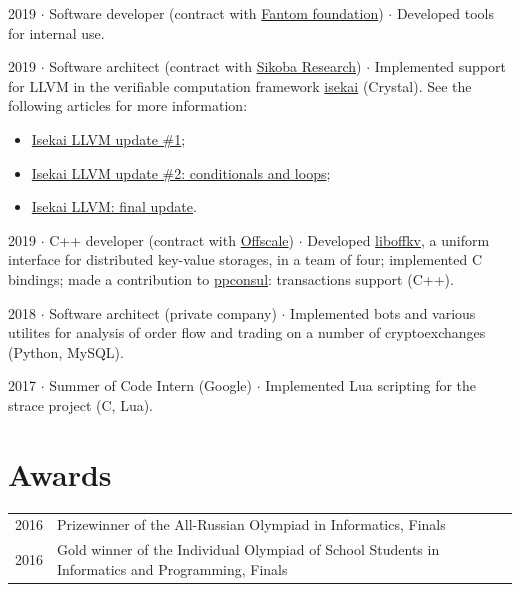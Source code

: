 \documentclass[10pt]{article}
\begin{document}
\medskip

2019 $\cdot$ Software developer (contract with \href{https://fantom.foundation}{Fantom foundation}) $\cdot$ Developed tools for internal use.

\medskip

2019 $\cdot$ Software architect (contract with \href{https://research.sikoba.com}{Sikoba Research}) $\cdot$ Implemented support for LLVM in the verifiable computation framework \href{https://github.com/sikoba/isekai}{isekai} (Crystal). See the following articles for more information:
\begin{itemize}
    \item \href{https://medium.com/sikoba-network/isekai-technical-update-llvm-d5003fc8f009}{Isekai LLVM update \#1};
    \item \href{https://medium.com/sikoba-network/isekai-llvm-update-2-conditionals-and-loops-81296a0eccbf}{Isekai LLVM update \#2: conditionals and loops};
    \item \href{https://medium.com/sikoba-network/isekai-llvm-final-update-894fb6863fcf}{Isekai LLVM: final update}.
\end{itemize}

\medskip

2019 $\cdot$ C++ developer (contract with \href{https://offscale.io}{Offscale}) $\cdot$ Developed \href{https://github.com/offscale/liboffkv}{liboffkv}, a uniform interface for distributed key-value storages, in a team of four; implemented C bindings; made a contribution to \href{https://github.com/oliora/ppconsul}{ppconsul}: transactions support (C++).

\medskip

2018 $\cdot$ Software architect (private company) $\cdot$ Implemented bots and various utilites for analysis of order flow and trading on a number of cryptoexchanges (Python, MySQL).

\medskip

2017 $\cdot$ Summer of Code Intern (Google) $\cdot$ Implemented Lua scripting for the strace project (C, Lua).

\medskip

\section{Awards}

\begin{tabular}{ l l }
    2016 & Prizewinner of the All-Russian Olympiad in Informatics, Finals \\
    2016 & Gold winner of the Individual Olympiad of School Students in Informatics and Programming, Finals \\
\end{tabular}
\end{document}
